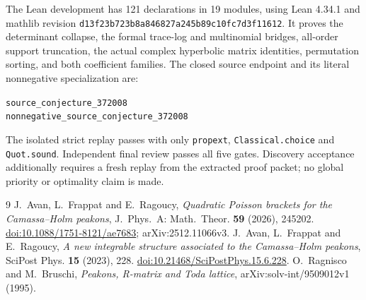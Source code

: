 \documentclass[11pt]{article}
\begin{document}
The Lean development has 121 declarations in 19 modules, using Lean 4.34.1 and mathlib revision\newline
\texttt{d13f23b723b8a846827a245b89c10fc7d3f11612}. It proves the determinant collapse, the formal trace-log and multinomial bridges, all-order support truncation, the actual complex hyperbolic matrix identities, permutation sorting, and both coefficient families. The closed source endpoint and its literal nonnegative specialization are:
\begin{center}\small\texttt{source\_conjecture\_372008}\\\texttt{nonnegative\_source\_conjecture\_372008}\end{center}
The isolated strict replay passes with only \texttt{propext}, \texttt{Classical.choice} and \texttt{Quot.sound}. Independent final review passes all five gates. Discovery acceptance additionally requires a fresh replay from the extracted proof packet; no global priority or optimality claim is made.

\small
\begin{thebibliography}{9}
 J.~Avan, L.~Frappat and E.~Ragoucy, \emph{Quadratic Poisson brackets for the Camassa--Holm peakons}, J.~Phys.~A: Math.~Theor. \textbf{59} (2026), 245202. \href{https://doi.org/10.1088/1751-8121/ae7683}{doi:10.1088/1751-8121/ae7683}; arXiv:2512.11066v3.
 J.~Avan, L.~Frappat and E.~Ragoucy, \emph{A new integrable structure associated to the Camassa--Holm peakons}, SciPost Phys. \textbf{15} (2023), 228. \href{https://doi.org/10.21468/SciPostPhys.15.6.228}{doi:10.21468/SciPostPhys.15.6.228}.
 O.~Ragnisco and M.~Bruschi, \emph{Peakons, R-matrix and Toda lattice}, arXiv:solv-int/9509012v1 (1995).
\end{thebibliography}
\end{document}
